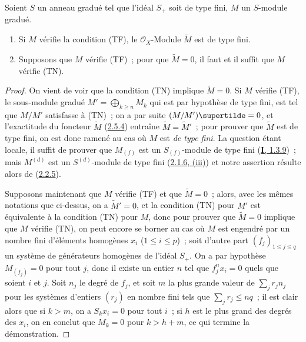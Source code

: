 \begin{proposition}[2.7.3]
\label{II.2.7.3-fr}
Soient $S$ un anneau gradué tel que l'idéal $S_+$ soit de type fini, $M$ un
$S$-module gradué.
\begin{enumerate}
  \item[\rm(i)] Si $M$ vérifie la condition \textup{(TF)}, le $\mathcal{O}_X$-Module
    $\widetilde{M}$ est de type fini.
  \item[\rm(ii)] Supposons que $M$ vérifie \textup{(TF)}~; pour que $\widetilde{M}=0$,
    il faut et il suffit que $M$ vérifie \textup{(TN)}.
\end{enumerate}
\end{proposition}

\begin{proof}
On vient de voir que la condition (TN) implique $\widetilde{M}=0$. Si $M$
vérifie (TF), le sous-module gradué $M'=\bigoplus_{k\geq n}M_k$ qui est par
hypothèse de type fini, est tel que $M/M'$ satisfasse à (TN)~; on a par suite
$(M/M')\supertilde=0$, et l'exactitude du foncteur
$\widetilde{M}$ (\hyperref[II.2.5.4-fr]{2.5.4}) entraîne
$\widetilde{M}=\widetilde{M}'$~; pour prouver que $\widetilde{M}$ est de type
fini, on est donc ramené au cas où $M$ est \emph{de type fini}. La question étant
locale, il suffit de prouver que $M_{(f)}$ est un $S_{(f)}$-module de type
fini (\hyperref[I.1.3.9-fr]{\textbf{I}, 1.3.9})~; mais $M^{(d)}$ est un
$S^{(d)}$-module de type fini (\hyperref[II.2.1.6-fr]{2.1.6, (iii)}) et notre
assertion résulte alors de (\hyperref[II.2.2.5-fr]{2.2.5}).

Supposons maintenant que $M$ vérifie (TF) et que $\widetilde{M}=0$~; alors,
avec les mêmes notations que ci-dessus, on a $\widetilde{M}'=0$, et la
condition (TN) pour $M'$ est équivalente à la condition (TN) pour $M$, donc
pour prouver que $\widetilde{M}=0$ implique que $M$ vérifie (TN), on peut
encore se borner au cas où $M$ est engendré par un nombre fini d'éléments
homogènes $x_i$ ($1\leq i\leq p$)~; soit d'autre part
$(f_j)_{1\leq j\leq q}$ un système de générateurs homogènes de l'idéal $S_+$.
On a par hypothèse $M_{(f_j)}=0$ pour tout $j$, donc il existe un entier $n$
tel que $f_j^nx_i=0$ quels que soient $i$ et $j$. Soit $n_j$ le degré de
$f_j$, et soit $m$ la plus grande valeur de $\sum_jr_jn_j$ pour les systèmes
d'entiers $(r_j)$ en nombre fini tels que $\sum_jr_j\leq nq$~; il est clair
alors
que si $k>m$, on a $S_kx_i=0$ pour tout $i$~; si $h$ est le plus grand des
degrés des $x_i$, on en conclut que $M_k=0$ pour $k>h+m$, ce qui termine la
démonstration.
\end{proof}

